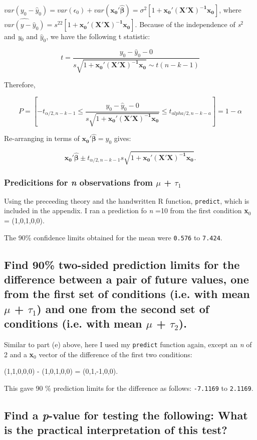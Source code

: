 \documentclass[11pt]{article}
\begin{document}
$var(y_0 - \hat{y}_0) = var(\epsilon_0) +
var(\mathbf{x_0'\hat{\beta}}) = \sigma^2[1+
\mathbf{x_0'(X'X)^{-1}x_0}]$, where 
$\widehat{var(y - \hat{y}_0)} = s^22[1+ \mathbf{x_0'(X'X)^{-1}x_0}]$. Because of the independence of \emph{s$^2$}
and \emph{y$_0$} and $\hat{y}_0$, we have the following t statistic:

$$t = \frac{y_0 - \hat{y}_0 - 0}{s\sqrt{1+
\mathbf{x_0'(X'X)^{-1}x_0}} \sim t(n-k-1)}$$



Therefore,

$$P = \left[ -t_{\alpha/2,n-k-1} \leq \frac{y_0 - \hat{y}_0 - 0}{s\sqrt{1+
\mathbf{x_0'(X'X)^{-1}x_0}}} \leq t_{alpha/2,n-k-a}\right] = 1 -
\alpha$$

Re-arranging in terms of $\mathbf{x_0'\hat{\beta}} = \hat{y}_0$ gives:

$$\mathbf{x_0'\hat{\beta}} \pm t_{\alpha/2,n-k-1}s\sqrt{1+
\mathbf{x_0'(X'X)^{-1}x_0}}.$$
\subsubsection{Predicitions for \emph{n} observations from $\mu$ + $\tau$$_1$}
\label{sec-1-5-2}


Using the preceeding theory and the handwritten R function,
\verb~predict~, which is included in the appendix. I ran a prediction fo
\emph{n} =10 from the first condition  \textbf{x$_0$} = (1,0,1,0,0).

The 90\% confidence limits obtained for the mean were 
\texttt{0.576} 
to
\texttt{7.424}.
\subsection{Find 90\% two-sided prediction limits for the difference between a pair of future values, one from the first set of conditions (i.e. with mean $\mu$ + $\tau$$_1$) and one from the second set of conditions (i.e. with mean $\mu$ + $\tau$$_2$).}
\label{sec-1-6}


Similar to part (e) above, here I used my \verb~predict~ function again,
except an \emph{n} of 2 and a \textbf{x$_0$} vector of the difference of the first
two conditions:

(1,1,0,0,0) - (1,0,1,0,0) = (0,1,-1,0,0).

This gave 90 \% prediction limits for the difference as follows:
\texttt{-7.1169}
to
\texttt{2.1169}.
\subsection{Find a \emph{p}-value for testing the following: What is the practical interpretation of this test?}
\label{sec-1-7}
\end{document}
